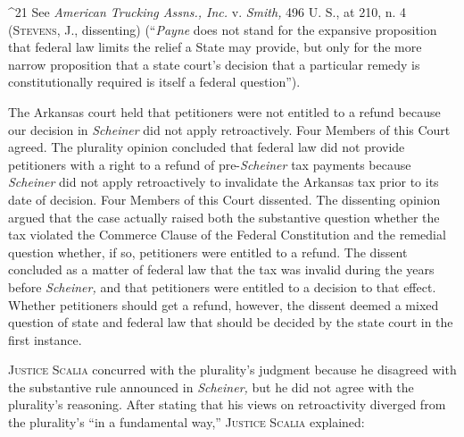 {{{{^21 See \emph{American Trucking Assns., Inc.} v. \emph{Smith,} 496 U. S., at
210, n. 4 (\textsc{Stevens,} J., dissenting) (``\emph{Payne} does not stand for
the expansive proposition that federal law limits the relief a State may
provide, but only for the more narrow proposition that a state court's
decision that a particular remedy is constitutionally required is itself
a federal question'').

  The Arkansas court held that petitioners were not entitled to a refund
because our decision in \emph{Scheiner} did not apply retroactively.
Four Members of this Court agreed. The plurality opinion concluded
that federal law did not provide petitioners with a right to a refund
of pre-\emph{Scheiner} tax payments because \emph{Scheiner} did not apply
retroactively to invalidate the Arkansas tax prior to its date of
decision. Four Members of this Court dissented. The dissenting opinion
argued that the case actually raised both the substantive question
whether the tax violated the Commerce Clause of the Federal Constitution
and the remedial question whether, if so, petitioners were entitled to
a refund. The dissent concluded as a matter of federal law that the tax
was invalid during the years before \emph{Scheiner,} and that petitioners
were entitled to a decision to that effect. Whether petitioners should
get a refund, however, the dissent deemed a mixed question of state
and federal law that should be decided by the state court in the first
instance.

  \textsc{Justice Scalia} concurred with the plurality's judgment because
he disagreed with the substantive rule announced in \emph{Scheiner,} but
he did not agree with the plurality's reasoning. After stating that
his views on retroactivity diverged from the plurality's ``in a
fundamental way,'' \textsc{Justice Scalia} explained:

}}}}

